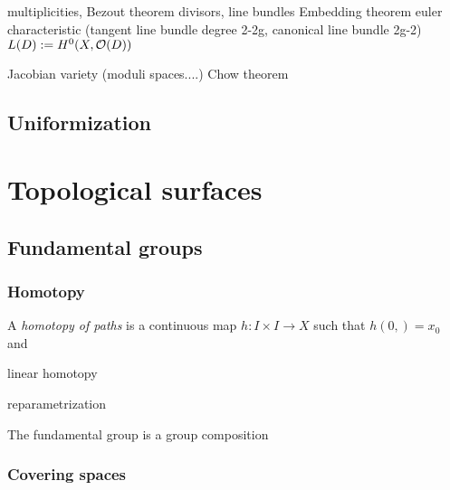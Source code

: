 \documentclass{../../large}
\begin{document}
multiplicities, Bezout theorem
divisors, line bundles
Embedding theorem
euler characteristic
(tangent line bundle degree 2-2g, canonical line bundle 2g-2)
$L(D):=H^0(X,\mathcal{O}(D))$

Jacobian variety (moduli spaces....)
Chow theorem


\chapter{Uniformization}

\iffalse
\section{Symmetry groups}
isometry, conformal, rigid motion, etc.
\section{Discrete subgroups}
continuous group actions?
(convex, locally finite) fundamental domains
tesselation, polygon theorem
Fuchsian and Kleinian
\fi




\part{Topological surfaces}


\chapter{Fundamental groups}

\section{Homotopy}
\begin{prb}
A \emph{homotopy of paths} is a continuous map $h:I\times I\to X$ such that $h(0,)=x_0$ and 
\begin{parts}
\item linear homotopy
\item reparametrization
\end{parts}
\end{prb}
\begin{prb}
The fundamental group is a group
composition
\end{prb}

\begin{prb}
\end{prb}

\section{Covering spaces}
\end{document}
